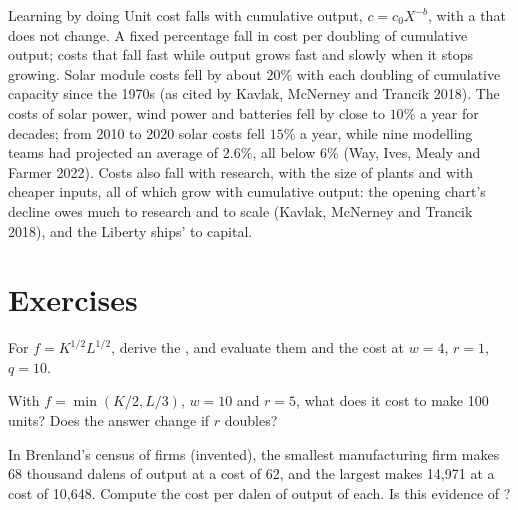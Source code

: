 \begin{model}{Learning by doing}
\assumes Unit cost falls with cumulative output, $c = c_0X^{-b}$, with a  that does not change.
\predicts A fixed percentage fall in cost per doubling of cumulative
output; costs that fall fast while output grows fast and slowly when it
stops growing.
\tested Solar module costs fell by about $20\%$ with each doubling of
cumulative capacity since the 1970s (as cited by Kavlak, McNerney and
Trancik 2018). %
The costs of solar power, wind power and batteries fell by close to $10\%$ a
year for decades; from 2010 to 2020 solar costs fell $15\%$ a year, while
nine modelling teams had projected an average of $2.6\%$, all below
$6\%$ (Way, Ives, Mealy and Farmer 2022). %
\breaks Costs also fall with research, with the size of plants and with
cheaper inputs, all of which grow with cumulative output: the opening
chart's decline owes much to research and to scale
(Kavlak, McNerney and Trancik 2018), %
and the Liberty ships' to capital.
\end{model}

\section*{Exercises}\label{sec:b1:cost-minimisation:exercises}

\begin{exercise}[$\star$]\label{exo:b1:cost-minimisation:cd}
For $f = K^{1/2}L^{1/2}$, derive the , and evaluate them
and the cost at $w = 4$, $r = 1$, $q = 10$.
\end{exercise}

\begin{exercise}[$\star$]\label{exo:b1:cost-minimisation:leontief}
With $f = \min(K/2, L/3)$, $w = 10$ and $r = 5$, what does it cost to make 100
units? Does the answer change if $r$ doubles?
\end{exercise}

\begin{exercise}[$\star$]\label{exo:b1:cost-minimisation:census}
In Brenland's census of firms (invented), the smallest manufacturing firm
makes 68 thousand dalens of output at a cost of 62, and the largest makes
14,971 at a cost of 10,648. %
Compute the cost per dalen of output of each. Is this evidence of
?
\end{exercise}

